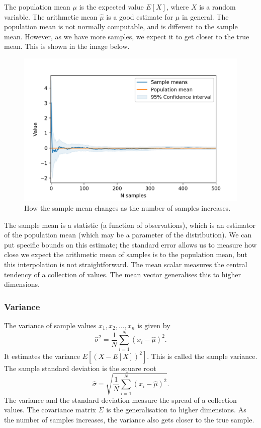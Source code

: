 \documentclass[a4paper, openany]{memoir}
\begin{document}
The population mean $\mu$ is the expected value $E[X]$, where $X$ is a random variable. The arithmetic mean $\hat{\mu}$ is a good estimate for $\mu$ in general. The population mean is not normally computable, and is different to the sample mean. However, as we have more samples, we expect it to get closer to the true mean. This is shown in the image below.
\begin{figure}[H]
    \centering
    \includegraphics[scale=0.7]{src/5.25 pop_mean.png}
    \caption{How the sample mean changes as the number of samples increases.}
\end{figure}
The sample mean is a statistic (a function of observations), which is an estimator of the population mean (which may be a parameter of the distribution). We can put specific bounds on this estimate; the standard error allows us to measure how close we expect the arithmetic mean of samples is to the population mean, but this interpolation is not straightforward.
The mean scalar measures the central tendency of a collection of values. The mean vector generalises this to higher dimensions.

\subsubsection{Variance}
The variance of sample values $x_1, x_2, \dots, x_n$ is given by
\[\hat{\sigma}^2 = \frac{1}{N} \sum_{i=1}^N (x_i - \hat{\mu})^2.\]
It estimates the variance $E[(X - E[X])^2]$. This is called the sample variance. The sample standard deviation is the square root
\[\hat{\sigma} = \sqrt{\frac{1}{N} \sum_{i=1}^N (x_i - \hat{\mu})^2}.\]
The variance and the standard deviation measure the spread of a collection values. The covariance matrix $\Sigma$ is the generalisation to higher dimensions. As the number of samples increases, the variance also gets closer to the true sample.
\end{document}
